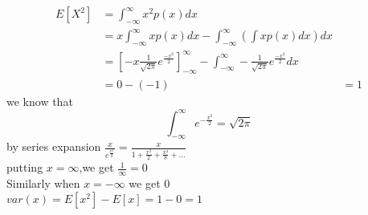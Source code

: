 \documentclass[journal,12pt,twocolumn]{IEEEtran}
\renewcommand\thesection{\arabic{section}}
\begin{document}
\begin{enumerate}[label=\thesection.\arabic*,ref=\thesection.\theenumi]
\begin{align*}
    E[X^2] &= \int_{-\infty}  ^{\infty} x^{2} p(x) dx \\
    &= x\int_{-\infty} ^{\infty} xp(x) dx - \int_{-\infty} ^{\infty} \left(\int xp(x) dx\right)dx\\
    &= \left[-x\frac{1}{\sqrt{2\pi}}e^{\frac{-x^2}{2}}\right]_{-\infty} ^{\infty} - \int_{-\infty} ^{\infty} -\frac{1}{\sqrt{2\pi}}e^{\frac{-x^2}{2}} dx  \\
    &= 0 - (-1)
    &= 1
\end{align*}
we know that
$$\int_{-\infty} ^{\infty} e^{-\frac{x^2}{2}} = \sqrt{2\pi}$$
by series expansion $\frac{x}{e^{\frac{x^2}{2}}} = \frac{x}{1 +\frac{x^2}{2} + \frac{x^4}{8} + ... }$ \\
putting $x = \infty$,we get $\frac{1}{\infty} = 0$ \\
Similarly when $x = -\infty$ we get 0 \\
$var(x) = E[x^2] - E[x] = 1 - 0 =1$
\end{enumerate}
\end{document}
